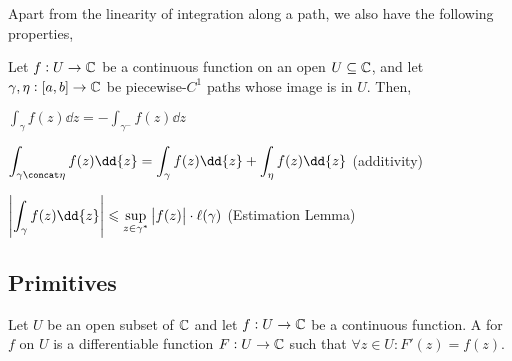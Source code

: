 \documentclass{styles/tufte}
\begin{document}
  Apart from the linearity of integration along a path, we also have the following properties,
  \begin{proposition}{}{}
    Let $f: U \to \mathbb{C}$ be a continuous function on an open $U \subseteq \mathbb{C}$, and let $\gamma, \eta: [a, b] \to \mathbb{C}$ be piecewise-$C^1$ paths whose image is in $U$. Then,
    \begin{romanenum}
      \item $\displaystyle \int_\gamma f(z) \dd{z} = -\int_{\gamma^-} f(z) \dd{z}$
      \item $\displaystyle \int_{\gamma \concat \eta} f(z) \dd{z} = \int_\gamma f(z) \dd{z} + \int_\eta f(z) \dd{z}$ \hfill (additivity)
      \item $\displaystyle \abs{\int_\gamma f(z) \dd{z}} \leqslant \sup_{z \in \gamma^*} \abs{f(z)} \cdot \ell(\gamma)$ \hfill (Estimation Lemma)
    \end{romanenum}
  \end{proposition}
  
\subsection{Primitives}
  
  \begin{definition}{}{}
    Let $U$ be an open subset of $\mathbb{C}$ and let $f: U \to \mathbb{C}$ be a continuous function. A  for $f$ on $U$ is a differentiable function $F: U \to \mathbb{C}$ such that $\forall z \in U: F'(z) = f(z)$.
  \end{definition}
  
\end{document}
